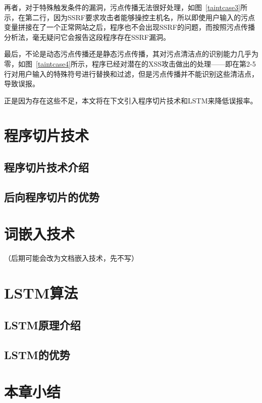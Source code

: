 再者，对于特殊触发条件的漏洞，污点传播无法很好处理，如图~\ref{taintcase3}所示，在第二行，因为SSRF要求攻击者能够操控主机名，所以即使用户输入的污点变量拼接在了一个正常网站之后，程序也不会出现SSRF的问题，而按照污点传播分析法，毫无疑问它会报告这段程序存在SSRF漏洞。

最后，不论是动态污点传播还是静态污点传播，其对污点清洁点的识别能力几乎为零，如图~\ref{taintcase4}所示，程序已经对潜在的XSS攻击做出的处理——即在第2-5行对用户输入的特殊符号进行替换和过滤，但是污点传播并不能识别这些清洁点，导致误报。

正是因为存在这些不足，本文将在下文引入程序切片技术和LSTM来降低误报率。\\

\section{程序切片技术}
\subsection{程序切片技术介绍}

\subsection{后向程序切片的优势}

\section{词嵌入技术}
（后期可能会改为文档嵌入技术，先不写）

\section{LSTM算法}
\subsection{LSTM原理介绍}
\subsection{LSTM的优势}

\section{本章小结}